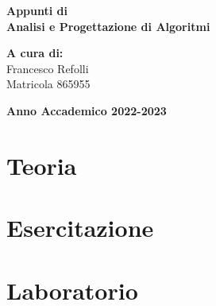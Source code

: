\documentclass[a4paper,12pt,oneside]{book}
\begin{document}
    
    \begin{titlepage}
        
	\vspace{40mm}
        
	\begin{center}
            {\LARGE{
                    \textbf{Appunti di \\ Analisi e Progettazione di Algoritmi}
                    \par
            }}
        \end{center}
        
        \vspace{50mm}

        \begin{flushright}
            {\large \textbf{A cura di:}} \\
            \large{Francesco Refolli} \\
            \large{Matricola 865955} 
        \end{flushright}
        
        \vspace{40mm}
        \begin{center}
            {\large{\bf Anno Accademico 2022-2023}}
        \end{center}

        \restoregeometry
        
    \end{titlepage}
    
    \printindex
    
    
    \part{Teoria}
    
    
    
    
    \part{Esercitazione}
    
    
    \part{Laboratorio}
    
\end{document}
